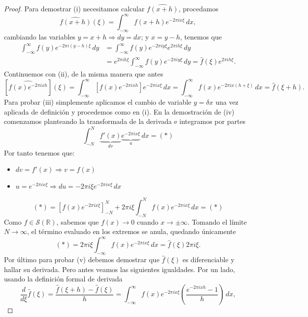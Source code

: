 \documentclass[12pt]{article}
\theoremstyle{plain}
\theoremstyle{definition}
\numberwithin{equation}{section}
\begin{document}
           \begin{proof}
                Para demostrar (i) necesitamos calcular \(\widehat{f(x+h)} \), procedamos
                $$ \widehat{f(x+h)}(\xi) = \int_{-\infty}^{\infty} f(x+h) e^{-2\pi ix\xi} \,dx,$$ 
                cambiando las variables \(y = x+h \Rightarrow dy = dx\); y \(x = y-h\), tenemos que
                \begin{align*}
                    \int_{-\infty}^{\infty} f(y) e^{-2\pi i(y-h)\xi} \,dy &= \int_{-\infty}^{\infty} f(y) e^{-2\pi iy\xi} e^{2\pi ih\xi}\,dy\\
                    &= e^{2\pi ih\xi} \int_{-\infty}^{\infty} f(y) e^{-2\pi iy\xi} \,dy = \hat{f}(\xi)e^{2\pi ih\xi}.
                \end{align*}
                Continuemos con (ii), de la misma manera que antes
                $$ [\widehat{f(x)e^{-2\pi ixh}}](\xi) = \int_{-\infty}^{\infty} [f(x)e^{-2\pi ixh}] e^{-2\pi ix\xi} \,dx = \int_{-\infty}^{\infty} f(x)e^{-2\pi i x(h+\xi)} \,dx = \hat{f}(\xi + h).$$
                Para probar (iii) simplemente aplicamos el cambio de variable \(y = \delta x\) una vez aplicada de definición y procedemos como en (i).
                En la demostración de (iv) comenzamos planteando la transformada de la derivada e integramos por partes
                $$ \int_{-N}^{N} \underbrace{f'(x)}_{dv} \underbrace{e^{-2\pi ix\xi}}_{u} \,dx = (\ast) $$ 
                Por tanto tenemos que:
                \begin{itemize}
                    \item \(dv = f'(x) \Rightarrow v = f(x)\)
                    \item \(u = e^{-2\pi ix\xi} \Rightarrow du = -2\pi i\xi e^{-2\pi ix\xi}\,dx\)
                \end{itemize}
                $$(\ast) = [f(x)e^{-2\pi ix\xi} ]_{-N}^{N} + 2\pi i\xi \int_{-N}^{N} f(x) e^{-2\pi ix\xi}\,dx = (\ast)$$ 
                Como $f \in \mathcal{S}(\mathbb{R})$, sabemos que $f(x) \to 0$ cuando $x \to \pm\infty$. Tomando el límite $N \to \infty$, el término evaluado en los extremos se anula, quedando únicamente
                $$(\ast) =2\pi i\xi \int_{-\infty}^{\infty} f(x) e^{-2\pi ix\xi}\,dx = \hat{f}(\xi)2\pi i\xi.$$
                Por último para probar (v) debemos demostrar que \(\hat{f}(\xi)\) es diferenciable y hallar su derivada. Pero antes veamos las siguientes igualdades. Por un lado, usando la definición formal de derivada
                $$ \frac{d}{d\xi}\hat{f}(\xi) = \frac{\hat{f}(\xi + h) - \hat{f}(\xi)}{h} =  \int_{-\infty}^{\infty} f(x) e^{-2\pi i x \xi} \left( \frac{e^{-2\pi i x h} - 1}{h} \right) \, dx,$$ 

\end{proof}
\end{document}
